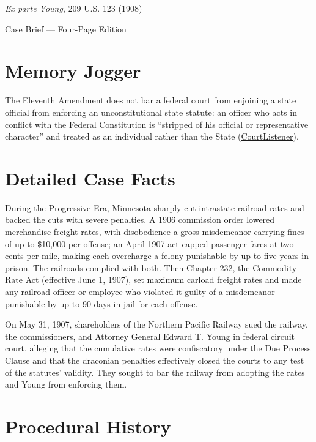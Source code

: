 \documentclass[12pt]{article}
\begin{document}
\begin{center}
{\LARGE \textit{Ex parte Young}, 209 U.S. 123 (1908)\par}
\vspace{0.8em}
{\large Case Brief --- Four-Page Edition\par}
\end{center}
\vspace{1em}

\section{Memory Jogger}

The Eleventh Amendment does not bar a federal court from enjoining a state official from enforcing an unconstitutional state statute: an officer who acts in conflict with the Federal Constitution is ``stripped of his official or representative character'' and treated as an individual rather than the State (\href{https://www.courtlistener.com/opinion/96819/ex-parte-young/}{CourtListener}).

\section{Detailed Case Facts}

During the Progressive Era, Minnesota sharply cut intrastate railroad rates and backed the cuts with severe penalties. A 1906 commission order lowered merchandise freight rates, with disobedience a gross misdemeanor carrying fines of up to \$10,000 per offense; an April 1907 act capped passenger fares at two cents per mile, making each overcharge a felony punishable by up to five years in prison. The railroads complied with both. Then Chapter 232, the Commodity Rate Act (effective June 1, 1907), set maximum carload freight rates and made any railroad officer or employee who violated it guilty of a misdemeanor punishable by up to 90 days in jail for each offense.

On May 31, 1907, shareholders of the Northern Pacific Railway sued the railway, the commissioners, and Attorney General Edward T. Young in federal circuit court, alleging that the cumulative rates were confiscatory under the Due Process Clause and that the draconian penalties effectively closed the courts to any test of the statutes' validity. They sought to bar the railway from adopting the rates and Young from enforcing them.

\section{Procedural History}
\end{document}
